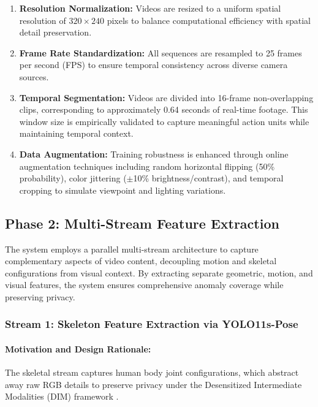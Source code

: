\documentclass[12pt]{article}
\begin{document}
\begin{enumerate}
    \item \textbf{Resolution Normalization:} Videos are resized to a uniform spatial resolution of $320 \times 240$ pixels to balance computational efficiency with spatial detail preservation.
    
    \item \textbf{Frame Rate Standardization:} All sequences are resampled to 25 frames per second (FPS) to ensure temporal consistency across diverse camera sources.
    
    \item \textbf{Temporal Segmentation:} Videos are divided into 16-frame non-overlapping clips, corresponding to approximately 0.64 seconds of real-time footage. This window size is empirically validated to capture meaningful action units while maintaining temporal context.
    
    \item \textbf{Data Augmentation:} Training robustness is enhanced through online augmentation techniques including random horizontal flipping (50\% probability), color jittering ($\pm$10\% brightness/contrast), and temporal cropping to simulate viewpoint and lighting variations.
\end{enumerate}

\clearpage
\subsection{Phase 2: Multi-Stream Feature Extraction}

The system employs a parallel multi-stream architecture to capture complementary aspects of video content, decoupling motion and skeletal configurations from visual context. By extracting separate geometric, motion, and visual features, the system ensures comprehensive anomaly coverage while preserving privacy.

\subsubsection{Stream 1: Skeleton Feature Extraction via YOLO11s-Pose}

\paragraph{Motivation and Design Rationale:}
The skeletal stream captures human body joint configurations, which abstract away raw RGB details to preserve privacy under the Desensitized Intermediate Modalities (DIM) framework \citep{liu2025privacy}. 
\end{document}
